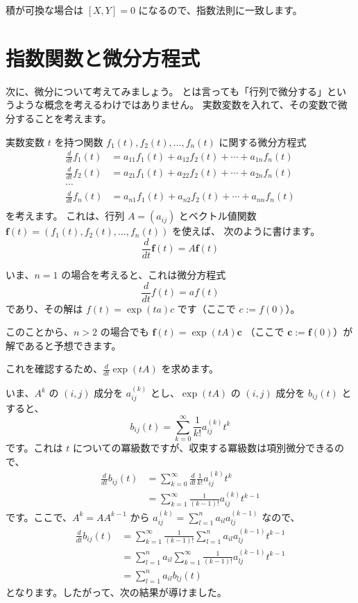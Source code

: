 \documentclass[a5paper]{ltjsarticle}
\begin{document}
積が可換な場合は \([X,Y] = 0\) になるので、指数法則に一致します。

\section{指数関数と微分方程式}

次に、微分について考えてみましょう。
とは言っても「行列で微分する」というような概念を考えるわけではありません。
実数変数を入れて、その変数で微分することを考えます。

実数変数 \(t\) を持つ関数 \(f_1(t), f_2(t), \dots, f_n(t)\) に関する微分方程式
\begin{align*}
    \frac{d}{dt} f_1(t) & = a_{11}f_1(t) + a_{12}f_2(t) + \cdots + a_{1n}f_n(t) \\
    \frac{d}{dt} f_2(t) & = a_{21}f_1(t) + a_{22}f_2(t) + \cdots + a_{2n}f_n(t) \\
    \cdots                                                                      \\
    \frac{d}{dt} f_n(t) & = a_{n1}f_1(t) + a_{n2}f_2(t) + \cdots + a_{nn}f_n(t) \\
\end{align*}
を考えます。
これは、行列 \(A = (a_{ij})\) とベクトル値関数 \(\boldsymbol{f}(t) = (f_1(t), f_2(t), \dots, f_n(t))\) を使えば、
次のように書けます。
\[
    \frac{d}{dt} \boldsymbol{f}(t) = A \boldsymbol{f}(t)
\]

いま、\(n = 1\) の場合を考えると、これは微分方程式
\[
    \frac{d}{dt} f(t) = a f(t)
\]
であり、その解は \(f(t) = \exp (ta) c\) です（ここで \(c := f(0)\)）。

このことから、\(n > 2\) の場合でも \(\boldsymbol{f}(t) = \exp (tA) \boldsymbol{c}\)
（ここで \(\boldsymbol{c} := \boldsymbol{f}(0)\)）が解であると予想できます。

これを確認するため、\(\frac{d}{dt} \exp (tA)\) を求めます。

いま、\(A^k\) の \((i,j)\) 成分を \(a^{(k)}_{ij}\) とし、\(\exp (tA)\) の \((i,j)\) 成分を \(b_{ij}(t)\) とすると、
\[
    b_{ij}(t) = \sum_{k=0}^{\infty} \frac{1}{k!} a^{(k)}_{ij} t^k
\]
です。これは \(t\) についての冪級数ですが、収束する冪級数は項別微分できるので、
\begin{align*}
    \frac{d}{dt} b_{ij}(t) & = \sum_{k=0}^{\infty} \frac{d}{dt} \frac{1}{k!} a^{(k)}_{ij} t^k \\
                           & = \sum_{k=1}^{\infty} \frac{1}{(k-1)!} a^{(k)}_{ij} t^{k-1}
\end{align*}
です。ここで、\(A^k = A A^{k-1}\) から \(a^{(k)}_{ij} = \sum_{l=1}^{n} a_{il}a^{(k-1)}_{lj}\) なので、
\begin{align*}
    \frac{d}{dt} b_{ij}(t) & = \sum_{k=1}^{\infty} \frac{1}{(k-1)!} \sum_{l=1}^{n} a_{il}a^{(k-1)}_{lj} t^{k-1}  \\
                           & = \sum_{l=1}^{n} a_{il} \sum_{k=1}^{\infty} \frac{1}{(k-1)!} a^{(k-1)}_{lj} t^{k-1} \\
                           & = \sum_{l=1}^{n} a_{il} b_{lj}(t)
\end{align*}
となります。したがって、次の結果が導けました。
\end{document}
